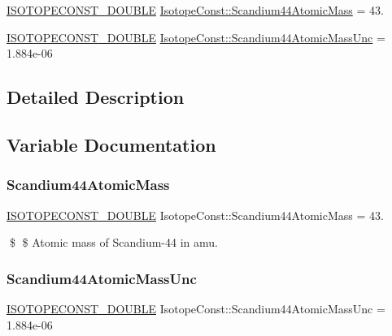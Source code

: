 \begin{DoxyCompactItemize}
\item 
\mbox{\hyperlink{group___isotope_const-_macros_ga8f45a7272ce02c0b4c65c44636ed719a}{I\+S\+O\+T\+O\+P\+E\+C\+O\+N\+S\+T\+\_\+\+D\+O\+U\+B\+LE}} \mbox{\hyperlink{group___isotope_const-_scandium-_sc44_ga9508c008d59e2560c341b07474477ce6}{Isotope\+Const\+::\+Scandium44\+Atomic\+Mass}} = 43.
\item 
\mbox{\hyperlink{group___isotope_const-_macros_ga8f45a7272ce02c0b4c65c44636ed719a}{I\+S\+O\+T\+O\+P\+E\+C\+O\+N\+S\+T\+\_\+\+D\+O\+U\+B\+LE}} \mbox{\hyperlink{group___isotope_const-_scandium-_sc44_gac615f82a3040fc46a96310a5eb561ce4}{Isotope\+Const\+::\+Scandium44\+Atomic\+Mass\+Unc}} = 1.\+884e-\/06
\end{DoxyCompactItemize}


\subsection{Detailed Description}


\subsection{Variable Documentation}
\mbox{\label{group___isotope_const-_scandium-_sc44_ga9508c008d59e2560c341b07474477ce6}} 
\subsubsection{\texorpdfstring{Scandium44\+Atomic\+Mass}{Scandium44AtomicMass}}
{\footnotesize\ttfamily \mbox{\hyperlink{group___isotope_const-_macros_ga8f45a7272ce02c0b4c65c44636ed719a}{I\+S\+O\+T\+O\+P\+E\+C\+O\+N\+S\+T\+\_\+\+D\+O\+U\+B\+LE}} Isotope\+Const\+::\+Scandium44\+Atomic\+Mass = 43.}

\$ \$ Atomic mass of Scandium-\/44 in amu. \mbox{\label{group___isotope_const-_scandium-_sc44_gac615f82a3040fc46a96310a5eb561ce4}} 
\subsubsection{\texorpdfstring{Scandium44\+Atomic\+Mass\+Unc}{Scandium44AtomicMassUnc}}
{\footnotesize\ttfamily \mbox{\hyperlink{group___isotope_const-_macros_ga8f45a7272ce02c0b4c65c44636ed719a}{I\+S\+O\+T\+O\+P\+E\+C\+O\+N\+S\+T\+\_\+\+D\+O\+U\+B\+LE}} Isotope\+Const\+::\+Scandium44\+Atomic\+Mass\+Unc = 1.\+884e-\/06}

